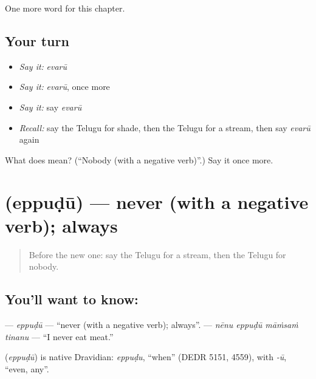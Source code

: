 \begin{grammarlens}[title={What you've built}]
One more word for this chapter.
\end{grammarlens}

\subsection*{Your turn}
\begin{itemize}
\raggedright
  \item \emph{Say it:} \emph{evarū}
  \item \emph{Say it:} \emph{evarū}, once more
  \item \emph{Say it:} say \emph{evarū}
  \item \emph{Recall:} say the Telugu for shade, then the Telugu for a stream, then say \emph{evarū} again
\end{itemize}

\begin{tcolorbox}[breakable,colback=teal!4,colframe=teal!35!black,title={Before you move on}]
What does  mean? (\textquotedblleft{}Nobody (with a negative verb)\textquotedblright{}.) Say it once more.
\end{tcolorbox}
\section[\texorpdfstring{\te{ఎప్పుడూ} (eppuḍū)}{ఎప్పుడూ (eppuḍū)}]{ (eppuḍū) — never (with a negative verb); always}

\label{lesson:TE-C153-eppudu}



\begin{quote}
Before the new one: say the Telugu for a stream, then the Telugu for nobody.
\end{quote}

\subsection*{You'll want to know: }
\textbf{} — \emph{eppuḍū} — \textquotedblleft{}never (with a negative verb); always\textquotedblright{}. \textbf{   } — \emph{nēnu eppuḍū māṁsaṁ tinanu} — \textquotedblleft{}I never eat meat.\textquotedblright{}

\begin{cousinweb}
\textbf{} (\emph{eppuḍū}) is native Dravidian: \emph{eppuḍu}, \textquotedblleft{}when\textquotedblright{} (DEDR 5151, 4559), with \emph{-ū}, \textquotedblleft{}even, any\textquotedblright{}.
\end{cousinweb}

